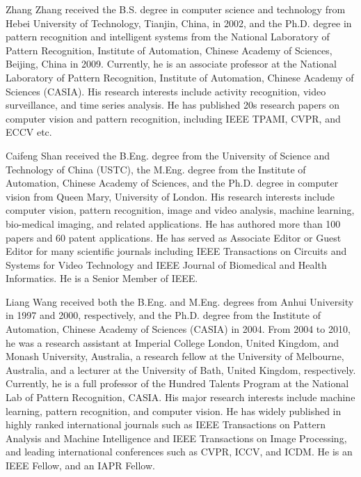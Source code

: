 \documentclass[10pt,journal,compsoc]{IEEEtran}
\begin{document}
\begin{IEEEbiography}{Zhang Zhang}
received the B.S. degree in computer science and technology from Hebei University of Technology, Tianjin, China, in 2002, and the Ph.D. degree in pattern recognition and intelligent systems from the National Laboratory of Pattern Recognition, Institute of Automation, Chinese Academy of Sciences, Beijing, China in 2009. Currently, he is an associate professor at the National Laboratory of Pattern Recognition, Institute of Automation, Chinese Academy of Sciences (CASIA). His research interests include activity recognition, video surveillance, and time series analysis. He has published 20s research papers on computer vision and pattern recognition, including IEEE TPAMI, CVPR, and ECCV etc.
\end{IEEEbiography}

\begin{IEEEbiography}{Caifeng Shan}
received the B.Eng. degree from the University of Science and Technology of China (USTC), the M.Eng. degree from the Institute of Automation, Chinese Academy of Sciences, and the Ph.D. degree in computer vision from Queen Mary, University of London. His research interests include computer vision, pattern recognition, image and video analysis, machine learning, bio-medical imaging, and related applications. He has authored more than 100 papers and 60 patent applications. He has served as Associate Editor or Guest Editor for many scientific journals including IEEE Transactions on Circuits and Systems for Video Technology and IEEE Journal of Biomedical and Health Informatics. He is a Senior Member of IEEE.
\end{IEEEbiography}

\begin{IEEEbiography}{Liang Wang}
received both the B.Eng. and M.Eng. degrees from Anhui University in 1997 and 2000, respectively, and the Ph.D. degree from the Institute of Automation, Chinese Academy of Sciences (CASIA) in 2004. From 2004 to 2010, he was a research assistant at Imperial College London, United Kingdom, and Monash University, Australia, a research fellow at the University of Melbourne, Australia, and a lecturer at the University of Bath, United Kingdom, respectively. Currently, he is a full professor of the Hundred Talents Program at the National Lab of Pattern Recognition, CASIA. His major research interests include machine learning, pattern recognition, and computer vision. He has widely published in highly ranked international journals such as IEEE Transactions on Pattern Analysis and Machine Intelligence and IEEE Transactions on Image Processing, and leading international conferences such as CVPR, ICCV, and ICDM. He is an IEEE Fellow, and an IAPR Fellow.
\end{IEEEbiography}
\end{document}
